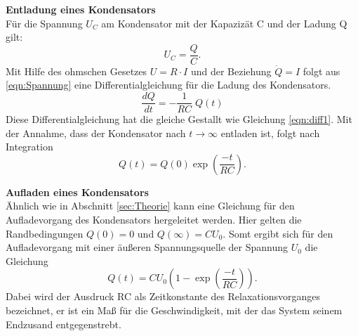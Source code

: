 \textbf{Entladung eines Kondensators}\\
\label{sec:Entladung}
Für die Spannung $U_{C}$ am Kondensator mit der Kapazizät C und der Ladung Q gilt:
\begin{equation}
  U_{C} = \frac{Q}{C}.
  \label{Spannung}
\end{equation}
Mit Hilfe des ohmschen Gesetzes $U=R\cdot I$ und der Beziehung $\dot{Q}=I$
folgt aus \eqref{eqn:Spannung} eine Differentialgleichung für die Ladung des
Kondensators.
\begin{equation}
  \frac{dQ}{dt}=- \frac{1}{RC}\; Q(t)
  \label{eqn:diff2}
\end{equation}
Diese Differentialgleichung hat die gleiche Gestallt wie Gleichung \eqref{eqn:diff1}.
Mit der Annahme, dass der Kondensator nach $t \to \infty$ entladen ist, folgt
nach Integration
\begin{equation}
  Q(t)=Q(0)\exp{(\frac{-t}{RC})}.
  \label{eqn:entladung}
\end{equation}

\textbf{Aufladen eines Kondensators} \\
Ähnlich wie in Abschnitt \ref{sec:Theorie} kann eine Gleichung für den
Aufladevorgang des Kondensators hergeleitet werden. Hier gelten die
Randbedingungen $Q(0)=0$ und $Q(\infty)=CU_{0}$. Somt ergibt sich
für den Aufladevorgang mit einer äußeren Spannungsquelle der Spannung $U_{0}$
die Gleichung
\begin{equation}
  Q(t)=CU_{0}(1-\exp{(\frac{-t}{RC})}).
  \label{aufladen}
\end{equation}
Dabei wird der Ausdruck RC als Zeitkonstante des Relaxationsvorganges bezeichnet,
er ist ein Maß für die Geschwindigkeit, mit der das System seinem Endzusand entgegenstrebt.\\
\\
